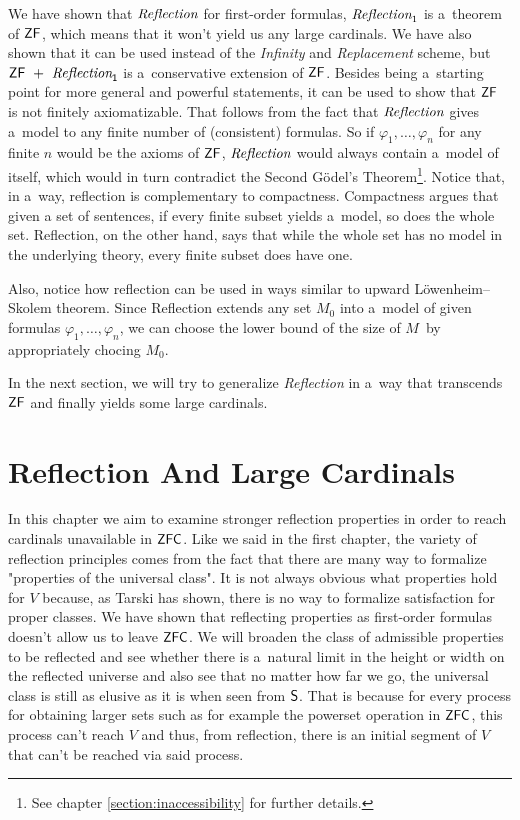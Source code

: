 \documentclass[12pt,a4paper]{article}
\begin{document}
We have shown that $\emph{Reflection}$ for first-order formulas, $\emph{Reflection}_1$ is a~theorem of $\sf{ZF}$, which means that it won't yield us any large cardinals. We have also shown that it can be used instead of the \emph{Infinity} and \emph{Replacement} scheme, but $\sf{ZF}\ +\ \emph{Reflection}_1$ is a~conservative extension of $\sf{ZF}$. Besides being a~starting point for more general and powerful statements, it can be used to show that $\sf{ZF}$ is not finitely axiomatizable. That follows from the fact that $\emph{Reflection}$ gives a~model to any finite number of (consistent) formulas. So if $\varphi_1, \ldots, \varphi_n$ for any finite $n$ would be the axioms of $\sf{ZF}$, $\emph{Reflection}$ would always contain a~model of itself, which would in turn contradict the Second Gödel's Theorem\footnote{See chapter \ref{section:inaccessibility} for further details.}.
Notice that, in a~way, reflection is complementary to compactness. Compactness argues that given a set of sentences, if every finite subset yields a~model, so does the whole set. Reflection, on the other hand, says that while the whole set has no model in the underlying theory, every finite subset does have one.

Also, notice how reflection can be used in ways similar to upward Löwenheim–Skolem theorem. Since Reflection extends any set $M_0$ into a~model of given formulas $\varphi_1, \ldots, \varphi_n$, we can choose the lower bound of the size of $M$ by appropriately chocing $M_0$.

In the next section, we will try to generalize \emph{Reflection} in a~way that transcends $\sf{ZF}$ and finally yields some large cardinals.
\newpage
\section{Reflection And Large Cardinals}

In this chapter we aim to examine stronger reflection properties in order to reach cardinals unavailable in $\sf{ZFC}$. Like we said in the first chapter, 
the variety of reflection principles comes from the fact that there are many way to formalize "properties of the universal class". It is not always obvious what properties hold for $V$ because, as Tarski
has shown, there is no way to formalize satisfaction for proper classes. We have shown that reflecting properties as first-order formulas doesn't allow us to leave $\sf{ZFC}$. We will broaden the class of admissible properties to be reflected and see whether there is a~natural limit in the height or width on the reflected universe and also see that no matter how far we go, the universal class is still as elusive as it is when seen from $\sf{S}$. That is because for every process for obtaining larger sets such as for example the powerset operation in $\sf{ZFC}$, this process can't reach $V$ and thus, from reflection, there is an initial segment of $V$ that can't be reached via said process.
\end{document}
